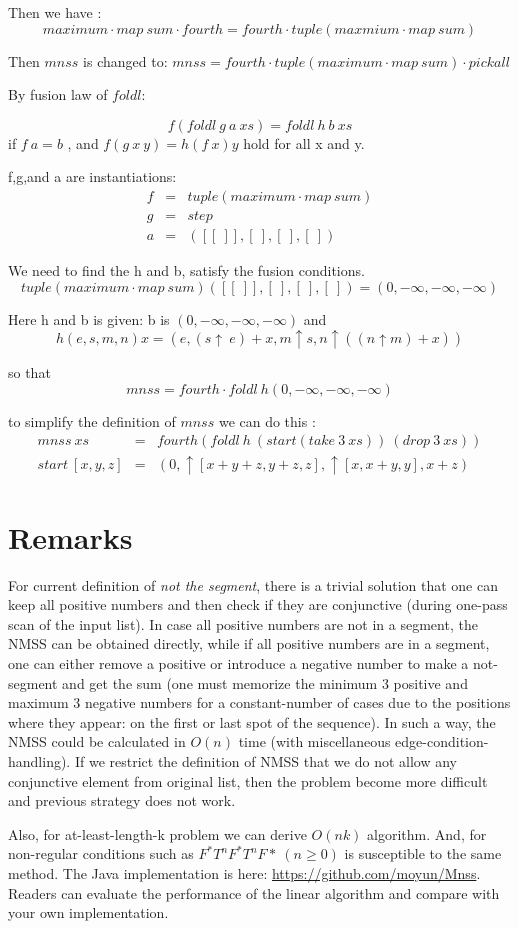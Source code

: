 \documentclass[10pt,a4paper]{article}
\begin{document}
Then we have :
\[
maximum \cdot map~ sum \cdot fourth = fourth \cdot tuple(maxmium \cdot map ~ sum)
\]

Then $mnss$ is changed to: \(mnss = fourth \cdot tuple( maximum \cdot map~sum)   \cdot pickall \)


By fusion law of $foldl$:

\[
f (foldl~ g~ a~xs) = foldl ~h~b~xs
\]
if \( f~a =b\) , and \(f(g~x~y)=h(f~x)y\) hold for all x and y.

f,g,and a are instantiations:
\[
\begin{array}{lll}
f &=& tuple(maximum \cdot map ~ sum) \\
g &=& step \\
a &=& ([[~]],[~],[~],[~])
\end{array}
\]

We need to find the h and b, satisfy the fusion conditions.
\[
tuple(maximum \cdot map ~ sum)([[~]],[~],[~],[~]) = (0,-\infty,-\infty,-\infty)
\]

Here h and b is given:
b is \((0,-\infty,-\infty,-\infty)\) and
\[
h(e,s,m,n) x = (e,(s \uparrow ~ e)+x ,m \uparrow s , n \uparrow( (n \uparrow m) +x) )
\]

so that 
\[
mnss = fourth \cdot foldl~h(0,-\infty,-\infty,-\infty)
\]

to simplify the definition of $mnss$ we can do this :
\[
\begin{array}{lll}
mnss ~ xs &=& fourth (foldl~h~(start(take~3~xs))~(drop~3~xs)) \\
start~[x,y,z] &=& (0, \uparrow[x+y+z,y+z,z], \uparrow[x,x+y,y], x+z)

\end{array}
\]

\section{Remarks}\label{remark}
For current definition of \textsl{not the segment}, there is a trivial solution that one can keep all positive numbers and
 then check if they are conjunctive (during one-pass scan of the input list). In case all positive numbers are not in a segment, the NMSS can be obtained directly, while
 if all positive numbers are in a segment, one can either remove a positive or introduce a negative number to make a not-segment and
 get the sum (one must memorize the minimum 3 positive and maximum 3 negative numbers for a constant-number of cases due to the positions where they appear: on the first or last spot of the sequence).
In such a way, the NMSS could be calculated in $O(n)$ time (with miscellaneous edge-condition-handling). If we restrict the definition of NMSS that we do not allow any conjunctive element from original list, then the problem become more difficult and previous strategy does not work.

Also, for at-least-length-k problem we can derive $O(nk)$ algorithm.
And, for non-regular conditions such as \( F^*T^nF^*T^nF* ~ (n \geq 0)\) is susceptible
to the same method.
The Java implementation is here: \url{https://github.com/moyun/Mnss}.
Readers can evaluate the performance of the linear algorithm and compare with your own implementation.



	
	
\end{document}
